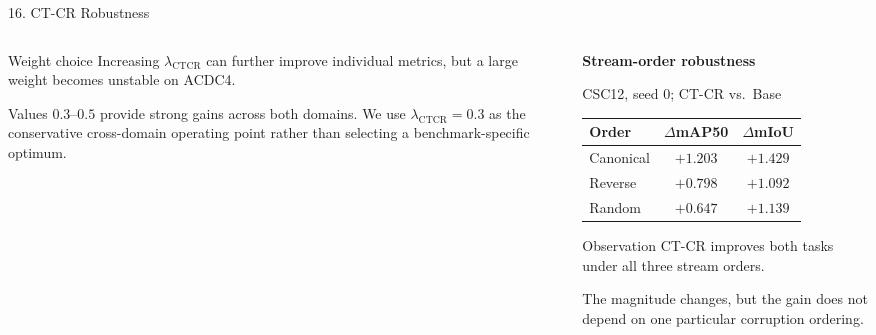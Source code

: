 \documentclass[aspectratio=169,11pt]{beamer}
\begin{document}
\begin{frame}{16. CT-CR Robustness}
\begin{columns}[T,onlytextwidth]
\begin{column}{0.56\textwidth}
\vspace{0.02cm}

\begin{block}{Weight choice}
\fontsize{5.6}{6.1}\selectfont
Increasing $\lambda_{\mathrm{CTCR}}$ can further improve individual metrics,
but a large weight becomes unstable on ACDC4.

Values $0.3$--$0.5$ provide strong gains across both domains.
We use \textbf{$\lambda_{\mathrm{CTCR}}=0.3$} as the conservative
cross-domain operating point rather than selecting a benchmark-specific optimum.
\end{block}

\end{column}

\begin{column}{0.41\textwidth}

\textbf{Stream-order robustness}

\vspace{0.02cm}

{\fontsize{6.7}{7.2}\selectfont CSC12, seed 0; CT-CR vs.\ Base}

\vspace{0.05cm}

\centering

\fontsize{6.6}{7.1}\selectfont
\setlength{\tabcolsep}{3.5pt}
\renewcommand{\arraystretch}{1.03}

\begin{tabular}{lcc}
\toprule
\textbf{Order}
& $\Delta$mAP50
& $\Delta$mIoU
\\
\midrule

Canonical
& $+1.203$
& $+1.429$
\\

Reverse
& $+0.798$
& $+1.092$
\\

Random
& $+0.647$
& $+1.139$
\\

\bottomrule
\end{tabular}

\vspace{0.18cm}

\begin{block}{Observation}
\fontsize{5.6}{6.1}\selectfont
CT-CR improves both tasks under all three stream orders.

The magnitude changes, but the gain does not depend on one particular
corruption ordering.
\end{block}


\end{column}
\end{columns}
\end{frame}
\end{document}
